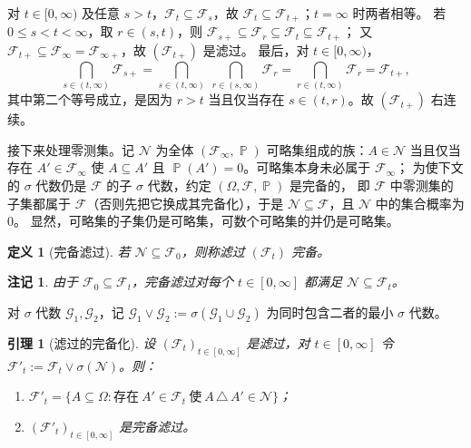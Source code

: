 \documentclass[UTF8,11pt,a4paper,oneside,fontset=fandol]{ctexrep}
\makeatletter
\numberwithin{equation}{section}
\theoremstyle{zhthm}
\newtheorem{lemma}[theorem]{引理}
\newtheorem{definition}[theorem]{定义}
\newtheorem{remark}[theorem]{注记}
\renewenvironment{proof}[1][\proofname]{\par
  \pushQED{\qed}%
  \normalfont\topsep6\p@\@plus6\p@\relax
  \trivlist
  \item[\hskip\labelsep\bfseries#1\hspace{0.5em}]\ignorespaces
}{%
  \popQED\endtrivlist\@endpefalse
}
\renewcommand{\proofname}{证明}
\newcommand{\F}{\mathcal{F}}
\newcommand{\G}{\mathcal{G}}
\DeclareMathOperator{\Prob}{\mathbb{P}}
\makeatother
\begin{document}
\begin{proof}
对 $t\in[0,\infty)$ 及任意 $s>t$，$\F_t\subseteq\F_s$，故 $\F_t\subseteq\F_{t+}$；$t=\infty$ 时两者相等。
若 $0\le s<t<\infty$，取 $r\in(s,t)$，则 $\F_{s+}\subseteq\F_r\subseteq\F_t\subseteq\F_{t+}$；
又 $\F_{t+}\subseteq\F_\infty=\F_{\infty+}$，故 $(\F_{t+})$ 是滤过。
最后，对 $t\in[0,\infty)$，
\[
  \bigcap_{s\in(t,\infty)}\F_{s+}=\bigcap_{s\in(t,\infty)}\ \bigcap_{r\in(s,\infty)}\F_r=\bigcap_{r\in(t,\infty)}\F_r=\F_{t+},
\]
其中第二个等号成立，是因为 $r>t$ 当且仅当存在 $s\in(t,r)$。故 $(\F_{t+})$ 右连续。
\end{proof}

接下来处理零测集。记 $\mathcal N$ 为全体 $(\F_\infty,\Prob)$ 可略集组成的族：$A\in\mathcal N$ 当且仅当
存在 $A'\in\F_\infty$ 使 $A\subseteq A'$ 且 $\Prob(A')=0$。可略集本身未必属于 $\F_\infty$；
为使下文的 $\sigma$ 代数仍是 $\F$ 的子 $\sigma$ 代数，约定 $(\Omega,\F,\Prob)$ 是完备的，
即 $\F$ 中零测集的子集都属于 $\F$（否则先把它换成其完备化），于是 $\mathcal N\subseteq\F$，且 $\mathcal N$ 中的集合概率为 $0$。
显然，可略集的子集仍是可略集，可数个可略集的并仍是可略集。

\begin{definition}[完备滤过]
\label{def:complete-filtration}
若 $\mathcal N\subseteq\F_0$，则称滤过 $(\F_t)$ 完备。
\end{definition}

\begin{remark}
由于 $\F_0\subseteq\F_t$，完备滤过对每个 $t\in[0,\infty]$ 都满足 $\mathcal N\subseteq\F_t$。
\end{remark}

对 $\sigma$ 代数 $\G_1,\G_2$，记 $\G_1\vee\G_2:=\sigma(\G_1\cup\G_2)$ 为同时包含二者的最小 $\sigma$ 代数。

\begin{lemma}[滤过的完备化]
\label{lem:filtration-completion}
设 $(\F_t)_{t\in[0,\infty]}$ 是滤过，对 $t\in[0,\infty]$ 令 $\F'_t:=\F_t\vee\sigma(\mathcal N)$。则：
\begin{enumerate}[label=(\arabic*)]
  \item $\F'_t=\{A\subseteq\Omega:\text{存在}\ A'\in\F_t\ \text{使}\ A\,\triangle\,A'\in\mathcal N\}$；
  \item $(\F'_t)_{t\in[0,\infty]}$ 是完备滤过。
\end{enumerate}
\end{lemma}
\end{document}
